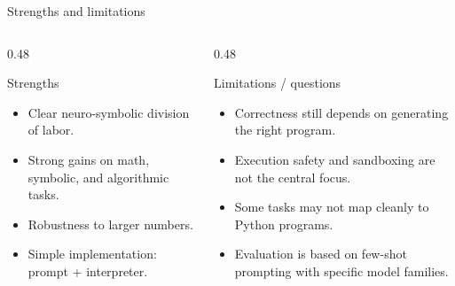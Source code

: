 \begin{frame}{Strengths and limitations}
\begin{columns}[T,totalwidth=\textwidth]
\begin{column}{0.48\textwidth}
\begin{exampleblock}{Strengths}
\begin{itemize}
  \item Clear neuro-symbolic division of labor.
  \item Strong gains on math, symbolic, and algorithmic tasks.
  \item Robustness to larger numbers.
  \item Simple implementation: prompt + interpreter.
\end{itemize}
\end{exampleblock}
\end{column}
\begin{column}{0.48\textwidth}
\begin{alertblock}{Limitations / questions}
\begin{itemize}
  \item Correctness still depends on generating the right program.
  \item Execution safety and sandboxing are not the central focus.
  \item Some tasks may not map cleanly to Python programs.
  \item Evaluation is based on few-shot prompting with specific model families.
\end{itemize}
\end{alertblock}
\end{column}
\end{columns}
\end{frame}
